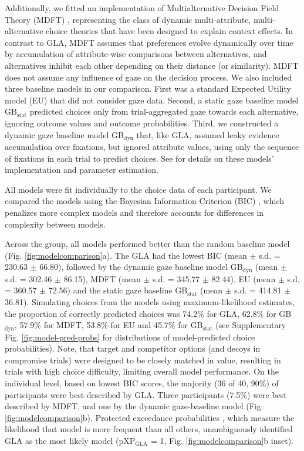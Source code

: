 \documentclass[11pt, a4paper]{article}
\begin{document}
Additionally, we fitted an implementation of Multialternative Decision Field Theory (MDFT) \autocite{roe2001MultialternativeDecisionField}, representing the class of dynamic multi-attribute, multi-alternative choice theories that have been designed to explain context effects. In contrast to GLA, MDFT assumes that preferences evolve dynamically over time by accumulation of attribute-wise comparisons between alternatives, and alternatives inhibit each other depending on their distance (or similarity). MDFT does not assume any influence of gaze on the decision process. We also included three baseline models in our comparison. First was a standard Expected Utility model (EU)\autocite{vonneumann1947TheoryGamesEconomic} that did not consider gaze data. Second, a static gaze baseline model GB$_{\text{stat}}$ predicted choices only from trial-aggregated gaze towards each alternative, ignoring outcome values and outcome probabilities. Third, we constructed a dynamic gaze baseline model GB$_{\text{dyn}}$ that, like GLA, assumed leaky evidence accumulation over fixations, but ignored attribute values, using only the sequence of fixations in each trial to predict choices. See  for details on these models' implementation and parameter estimation.

All models were fit individually to the choice data of each participant. We compared the models using the Bayesian Information Criterion (BIC) \autocite{schwarz1978EstimatingDimensionModel}, which penalizes more complex models and therefore accounts for differences in complexity between models.

Across the group, all models performed better than the random baseline model (Fig. \ref{fig:modelcomparison}a). The GLA had the lowest BIC (mean $\pm$ s.d. = 230.63 $\pm$ 66.80), followed by the dynamic gaze baseline model GB$_{\text{dyn}}$ (mean $\pm$ s.d. = 302.46 $\pm$ 86.15), MDFT (mean $\pm$ s.d. = 345.77 $\pm$ 82.44), EU (mean $\pm$ s.d. = 360.57 $\pm$ 72.56) and the static gaze baseline GB$_{\text{stat}}$ (mean $\pm$ s.d. = 414.81 $\pm$ 36.81). Simulating choices from the models using maximum-likelihood estimates, the proportion of correctly predicted choices was 74.2\% for GLA, 62.8\% for GB$_{\text{dyn}}$, 57.9\% for MDFT, 53.8\% for EU and 45.7\% for GB$_{\text{stat}}$ (see Supplementary Fig. \ref{fig:model-pred-probs} for distributions of model-predicted choice probabilities). Note, that target and competitor options (and decoys in compromise trials) were designed to be closely matched in value, resulting in trials with high choice difficulty, limiting overall model performance. On the individual level, based on lowest BIC scores, the majority (36 of 40, 90\%) of participants were best described by GLA. Three participants (7.5\%) were best described by MDFT, and one by the dynamic gaze-baseline model (Fig. \ref{fig:modelcomparison}b). Protected exceedance probabilities \autocite{rigoux2014BayesianModelSelection}, which measure the likelihood that model is more frequent than all others, unambiguously identified GLA as the most likely model (pXP$_{\text{GLA}}$ = 1, Fig. \ref{fig:modelcomparison}b inset).
\end{document}
